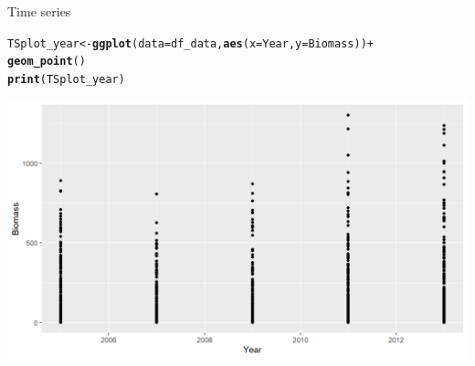 \documentclass{beamer}\usepackage[]{graphicx}\usepackage[]{color}
\makeatletter
\newcommand{\hlopt}[1]{\textcolor[rgb]{0,0,0}{#1}}%
\newcommand{\hlstd}[1]{\textcolor[rgb]{0.345,0.345,0.345}{#1}}%
\newcommand{\hlkwb}[1]{\textcolor[rgb]{0.69,0.353,0.396}{#1}}%
\newcommand{\hlkwc}[1]{\textcolor[rgb]{0.333,0.667,0.333}{#1}}%
\newcommand{\hlkwd}[1]{\textcolor[rgb]{0.737,0.353,0.396}{\textbf{#1}}}%
\newenvironment{kframe}{%
 \def\at@end@of@kframe{}%
 \ifinner\ifhmode%
  \def\at@end@of@kframe{\end{minipage}}%
  \begin{minipage}{\columnwidth}%
 \fi\fi%
 \def\FrameCommand##1{\hskip\@totalleftmargin \hskip-\fboxsep
 \colorbox{shadecolor}{##1}\hskip-\fboxsep
     \hskip-\linewidth \hskip-\@totalleftmargin \hskip\columnwidth}%
 \MakeFramed {\advance\hsize-\width
   \@totalleftmargin\z@ \linewidth\hsize
   \@setminipage}}%
 {\par\unskip\endMakeFramed%
 \at@end@of@kframe}
\newenvironment{knitrout}{}{} %
\makeatother
\begin{document}
\begin{frame}[fragile]{Time series}
\begin{knitrout}\footnotesize
{}\color{fgcolor}\begin{kframe}
\begin{alltt}
\hlstd{TSplot_year} \hlkwb{<-} \hlkwd{ggplot}\hlstd{(}\hlkwc{data}\hlstd{=df_data,} \hlkwd{aes}\hlstd{(}\hlkwc{x}\hlstd{=Year,} \hlkwc{y}\hlstd{=Biomass))} \hlopt{+}
  \hlkwd{geom_point}\hlstd{()}
\hlkwd{print}\hlstd{(TSplot_year)}
\end{alltt}
\end{kframe}

{\centering \includegraphics[width=.9\linewidth]{figure/sp_TSplot_year-1} 

}



\end{knitrout}
\end{frame}
\end{document}
